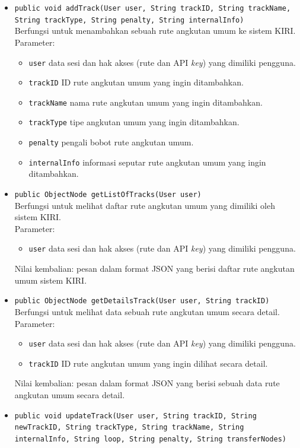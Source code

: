 \begin{itemize}
	\item \texttt{public void addTrack(User user, String trackID, String trackName, String trackType, String penalty, String internalInfo)}\\
	Berfungsi untuk menambahkan sebuah rute angkutan umum ke sistem KIRI.\\
	Parameter:
	\begin{itemize}
		\item \texttt{user} data sesi dan hak akses (rute dan API \textit{key}) yang dimiliki pengguna.
		\item \texttt{trackID} ID rute angkutan umum yang ingin ditambahkan.
		\item \texttt{trackName} nama rute angkutan umum yang ingin ditambahkan.
		\item \texttt{trackType} tipe angkutan umum yang ingin ditambahkan.
		\item \texttt{penalty} pengali bobot rute angkutan umum.
		\item \texttt{internalInfo} informasi seputar rute angkutan umum yang ingin ditambahkan.
	\end{itemize}
	\item \texttt{public ObjectNode getListOfTracks(User user)}\\
	Berfungsi untuk melihat daftar rute angkutan umum yang dimiliki oleh sistem KIRI.\\
	Parameter:
	\begin{itemize}
		\item \texttt{user} data sesi dan hak akses (rute dan API \textit{key}) yang dimiliki pengguna.
	\end{itemize}
	Nilai kembalian: pesan dalam format JSON yang berisi daftar rute angkutan umum sistem KIRI.
	\item \texttt{public ObjectNode getDetailsTrack(User user, String trackID)}\\
	Berfungsi untuk melihat data sebuah rute angkutan umum secara detail.\\
	Parameter:
	\begin{itemize}
		\item \texttt{user} data sesi dan hak akses (rute dan API \textit{key}) yang dimiliki pengguna.
		\item \texttt{trackID} ID rute angkutan umum yang ingin dilihat secara detail.
	\end{itemize}
	Nilai kembalian: pesan dalam format JSON yang berisi sebuah data rute angkutan umum secara detail.
	\item \texttt{public void updateTrack(User user, String trackID, String newTrackID, String trackType, String trackName, String internalInfo, String loop, String penalty, String transferNodes)}\\

\end{itemize}

